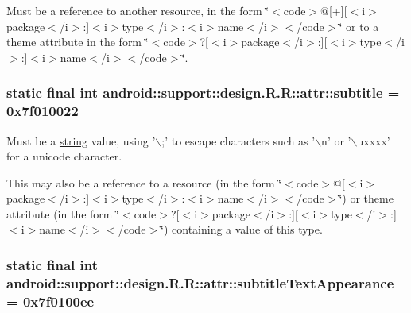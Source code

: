 Must be a reference to another resource, in the form \char`\"{}$<$code$>$@\mbox{[}+\mbox{]}\mbox{[}$<$i$>$package$<$/i$>$:\mbox{]}$<$i$>$type$<$/i$>$:$<$i$>$name$<$/i$>$$<$/code$>$\char`\"{} or to a theme attribute in the form \char`\"{}$<$code$>$?\mbox{[}$<$i$>$package$<$/i$>$:\mbox{]}\mbox{[}$<$i$>$type$<$/i$>$:\mbox{]}$<$i$>$name$<$/i$>$$<$/code$>$\char`\"{}. \hypertarget{classandroid_1_1support_1_1design_1_1_r_1_1attr_aef235139bf226708a7520eba55a340e}{
\subsubsection[{subtitle}]{\setlength{\rightskip}{0pt plus 5cm}static final int android::support::design.R.R::attr::subtitle = 0x7f010022}}
\label{classandroid_1_1support_1_1design_1_1_r_1_1attr_aef235139bf226708a7520eba55a340e}


Must be a \hyperlink{classandroid_1_1support_1_1design_1_1_r_1_1string}{string} value, using '$\backslash$;' to escape characters such as '$\backslash$n' or '$\backslash$uxxxx' for a unicode character. 

This may also be a reference to a resource (in the form \char`\"{}$<$code$>$@\mbox{[}$<$i$>$package$<$/i$>$:\mbox{]}$<$i$>$type$<$/i$>$:$<$i$>$name$<$/i$>$$<$/code$>$\char`\"{}) or theme attribute (in the form \char`\"{}$<$code$>$?\mbox{[}$<$i$>$package$<$/i$>$:\mbox{]}\mbox{[}$<$i$>$type$<$/i$>$:\mbox{]}$<$i$>$name$<$/i$>$$<$/code$>$\char`\"{}) containing a value of this type. \hypertarget{classandroid_1_1support_1_1design_1_1_r_1_1attr_650be6b0206e8d5bb6e81af6cdbf5e9a}{
\subsubsection[{subtitleTextAppearance}]{\setlength{\rightskip}{0pt plus 5cm}static final int android::support::design.R.R::attr::subtitleTextAppearance = 0x7f0100ee}}
\label{classandroid_1_1support_1_1design_1_1_r_1_1attr_650be6b0206e8d5bb6e81af6cdbf5e9a}


